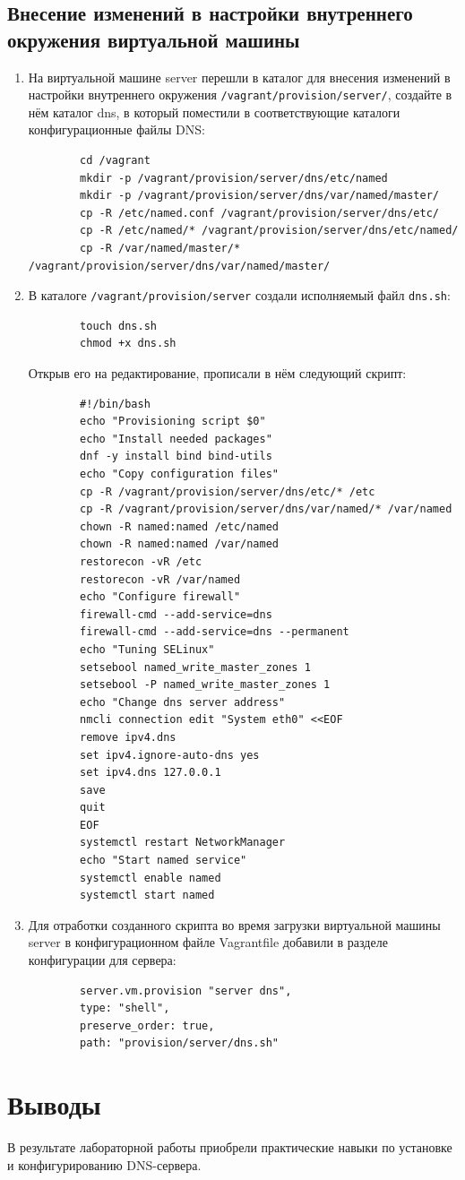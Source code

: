 \subsection{Внесение изменений в настройки внутреннего окружения виртуальной машины}
\begin{enumerate}
    \item На виртуальной машине server перешли в каталог для внесения изменений в настройки внутреннего окружения {\tt /vagrant/provision/server/}, создайте в нём каталог dns, в который поместили в соответствующие каталоги конфигурационные файлы DNS:
        \begin{verbatim}
        cd /vagrant
        mkdir -p /vagrant/provision/server/dns/etc/named
        mkdir -p /vagrant/provision/server/dns/var/named/master/
        cp -R /etc/named.conf /vagrant/provision/server/dns/etc/
        cp -R /etc/named/* /vagrant/provision/server/dns/etc/named/
        cp -R /var/named/master/* /vagrant/provision/server/dns/var/named/master/
        \end{verbatim}
    \item В каталоге {\tt /vagrant/provision/server} создали исполняемый файл {\tt dns.sh}:
        \begin{verbatim}
        touch dns.sh
        chmod +x dns.sh
        \end{verbatim}
        Открыв его на редактирование, прописали в нём следующий скрипт:
        \begin{verbatim}
        #!/bin/bash
        echo "Provisioning script $0"
        echo "Install needed packages"
        dnf -y install bind bind-utils
        echo "Copy configuration files"
        cp -R /vagrant/provision/server/dns/etc/* /etc
        cp -R /vagrant/provision/server/dns/var/named/* /var/named
        chown -R named:named /etc/named
        chown -R named:named /var/named
        restorecon -vR /etc
        restorecon -vR /var/named
        echo "Configure firewall"
        firewall-cmd --add-service=dns
        firewall-cmd --add-service=dns --permanent
        echo "Tuning SELinux"
        setsebool named_write_master_zones 1
        setsebool -P named_write_master_zones 1
        echo "Change dns server address"
        nmcli connection edit "System eth0" <<EOF
        remove ipv4.dns
        set ipv4.ignore-auto-dns yes
        set ipv4.dns 127.0.0.1
        save
        quit
        EOF
        systemctl restart NetworkManager
        echo "Start named service"
        systemctl enable named
        systemctl start named
        \end{verbatim}
    \item Для отработки созданного скрипта во время загрузки виртуальной машины server в конфигурационном файле Vagrantfile добавили в разделе конфигурации для сервера:
        \begin{verbatim}
        server.vm.provision "server dns",
        type: "shell",
        preserve_order: true,
        path: "provision/server/dns.sh"
        \end{verbatim}
\end{enumerate}
\section{Выводы}
В результате лабораторной работы приобрели практические навыки по установке и конфигурированию DNS-сервера.


